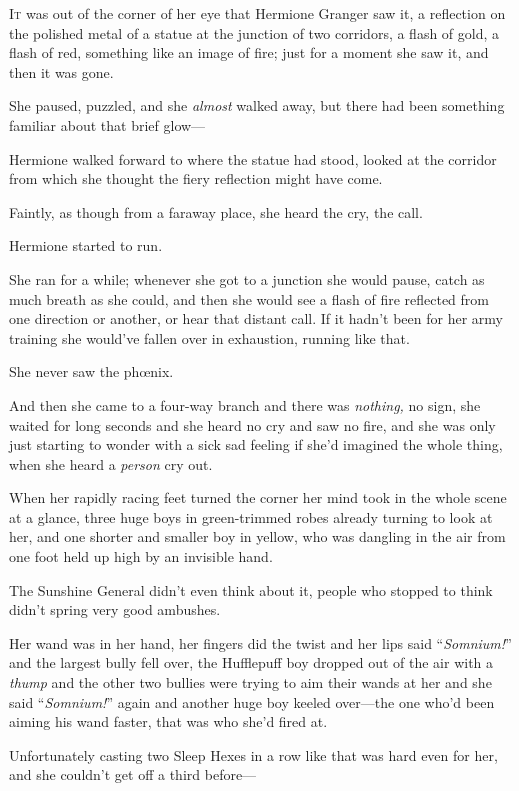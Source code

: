 
\lettrine{I}{t} was out of the corner of her eye that Hermione Granger saw it, a reflection on the polished metal of a statue at the junction of two corridors, a flash of gold, a flash of red, something like an image of fire; just for a moment she saw it, and then it was gone.

She paused, puzzled, and she \emph{almost} walked away, but there had been something familiar about that brief glow—

Hermione walked forward to where the statue had stood, looked at the corridor from which she thought the fiery reflection might have come.

Faintly, as though from a faraway place, she heard the cry, the call.

Hermione started to run.

She ran for a while; whenever she got to a junction she would pause, catch as much breath as she could, and then she would see a flash of fire reflected from one direction or another, or hear that distant call. If it hadn’t been for her army training she would’ve fallen over in exhaustion, running like that.

She never saw the phœnix.

And then she came to a four-way branch and there was \emph{nothing,} no sign, she waited for long seconds and she heard no cry and saw no fire, and she was only just starting to wonder with a sick sad feeling if she’d imagined the whole thing, when she heard a \emph{person} cry out.

When her rapidly racing feet turned the corner her mind took in the whole scene at a glance, three huge boys in green-trimmed robes already turning to look at her, and one shorter and smaller boy in yellow, who was dangling in the air from one foot held up high by an invisible hand.

The Sunshine General didn’t even think about it, people who stopped to think didn’t spring very good ambushes.

Her wand was in her hand, her fingers did the twist and her lips said “\emph{Somnium!}” and the largest bully fell over, the Hufflepuff boy dropped out of the air with a \emph{thump} and the other two bullies were trying to aim their wands at her and she said “\emph{Somnium!}” again and another huge boy keeled over—the one who’d been aiming his wand faster, that was who she’d fired at.

Unfortunately casting two Sleep Hexes in a row like that was hard even for her, and she couldn’t get off a third before—

